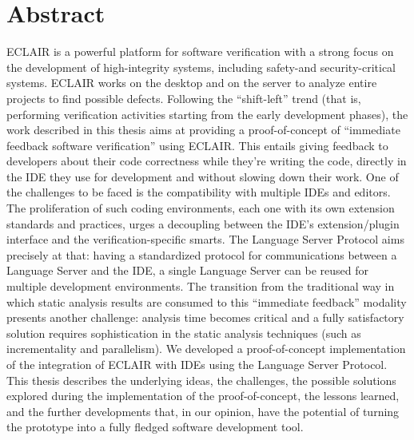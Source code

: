 \chapter*{Abstract}
ECLAIR is a powerful platform for software verification with a strong focus on the development of high-integrity systems, including safety-and security-critical systems. ECLAIR works on the desktop and on the server to analyze entire projects to find possible defects. Following the ``shift-left'' trend (that is, performing verification activities starting from the early development phases), the work described in this thesis aims at providing a proof-of-concept of ``immediate feedback software verification'' using ECLAIR. This entails giving feedback to developers about their code correctness while they're writing the code, directly in the IDE they use for development and without slowing down their work.
One of the challenges to be faced is the compatibility with multiple IDEs and editors. The proliferation of such coding environments, each one with its own extension standards and practices, urges a decoupling between the IDE's extension/plugin interface and the verification-specific smarts. The Language Server Protocol aims precisely at that: having a standardized protocol for communications between a Language Server and the IDE, a single Language Server can be reused for multiple development environments.
The transition from the traditional way in which static analysis results are consumed to this ``immediate feedback'' modality presents another challenge: analysis time becomes critical and a fully satisfactory solution requires sophistication in the static analysis techniques (such as incrementality and parallelism).
We developed a proof-of-concept implementation of the integration of ECLAIR with IDEs using the Language Server Protocol. This thesis describes the underlying ideas, the challenges, the possible solutions explored during the implementation of the proof-of-concept, the lessons learned, and the further developments that, in our opinion, have the potential of turning the prototype into a fully fledged software development tool.
